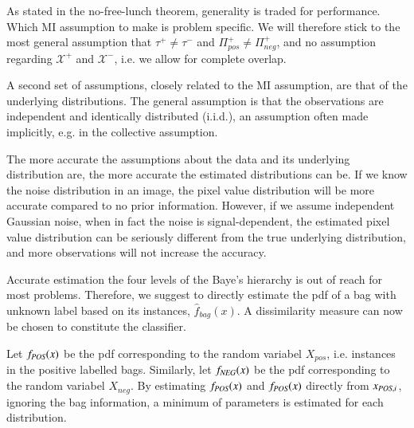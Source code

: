 As stated in the no-free-lunch theorem, generality is traded for performance. 
Which MI assumption to make is problem specific. 
We will therefore stick to the most general assumption that $\tau^+ \neq \tau^-$ and $\Pi^+_{pos} \neq \Pi^+_{neg}$, and no assumption regarding $\mathcal{X^+}$ and $\mathcal{X^-}$, i.e. we allow for complete overlap.

A second set of assumptions, closely related to the MI assumption, are that of the underlying distributions. 
The general assumption is that the observations are independent and identically distributed (i.i.d.), an assumption often made implicitly, e.g. in the collective assumption. 

The more accurate the assumptions about the data and its underlying distribution are, the more accurate the estimated distributions can be. 
If we know the noise distribution in an image, the pixel value distribution will be more accurate compared to no prior information. 
However, if we assume independent Gaussian noise, when in fact the noise is signal-dependent, the estimated pixel value distribution can be seriously different from the true underlying distribution, and more observations will not increase the accuracy. 

Accurate estimation the four levels of the Baye's hierarchy is out of reach for most problems. 
Therefore, we suggest to directly estimate the pdf of a bag with unknown label based on its instances, $\hat{f}_{bag}(x)$.
A dissimilarity measure can now be chosen to constitute the classifier. 

Let $f_{\text{\scriptsize{{\it POS}}}}(x)$ be the pdf corresponding to the random variabel $X_{pos}$, i.e. instances in the positive labelled bags. Similarly, let $f_{\text{\scriptsize{{\it NEG}}}}(x)$ be the pdf corresponding to the random variabel $X_{neg}$. 
By estimating $f_{\text{\scriptsize{{\it POS}}}}(x)$ and  $f_{\text{\scriptsize{{\it POS}}}}(x)$ directly from $x_{\text{\scriptsize{{\it POS}}},i}$, ignoring the bag information, a minimum of parameters is estimated for each distribution. 

